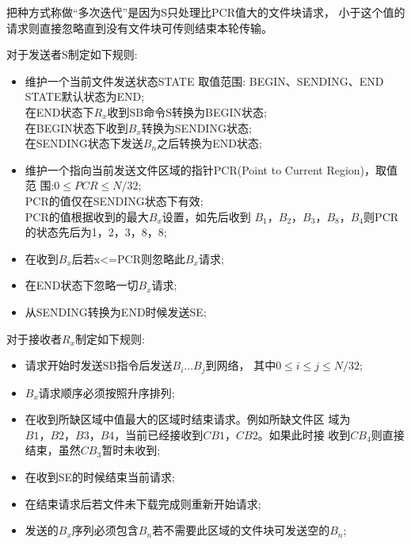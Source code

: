 把种方式称做``多次迭代''是因为S只处理比PCR值大的文件块请求，
小于这个值的请求则直接忽略直到没有文件块可传则结束本轮传输。

对于发送者S制定如下规则:
\begin{itemize}
	\item
		维护一个当前文件发送状态STATE 取值范围: BEGIN、SENDING、END
		STATE默认状态为END; \\
		在END状态下$R_x$收到SB命令S转换为BEGIN状态;\\
		在BEGIN状态下收到$B_x$转换为SENDING状态; \\
		在SENDING状态下发送$B_n$之后转换为END状态;
	\item 维护一个指向当前发送文件区域的指针PCR(Point to Current Region)，取值范
		围:$0\leq PCR\leq N/32$;\\
		PCR的值仅在SENDING状态下有效; \\
		PCR的值根据收到的最大$B_x$设置，如先后收到
		$B_1，B_2，B_3，B_8，B_4$则PCR的状态先后为1，2，3，8，8;
	\item 在收到$B_x$后若x<=PCR则忽略此$B_x$请求;
	\item 在END状态下忽略一切$B_x$请求;
	\item 从SENDING转换为END时候发送SE;
\end{itemize}


对于接收者$R_x$制定如下规则:
\begin{itemize}
	\item 请求开始时发送SB指令后发送$B_i\ldots B_j$到网络，
		其中$0 \leq i \le j \leq N/32$;
	\item $B_x$请求顺序必须按照升序排列;
	\item 在收到所缺区域中值最大的区域时结束请求。例如所缺文件区
		域为$B1，B2，B3，B4$，当前已经接收到$CB1，CB2$。如果此时接
		收到$CB_4$则直接结束，虽然$CB_3$暂时未收到;

	\item 在收到SE的时候结束当前请求;
	\item 在结束请求后若文件未下载完成则重新开始请求;
	\item 发送的$B_x$序列必须包含$B_n$若不需要此区域的文件块可发送空的$B_n$;
\end{itemize}

